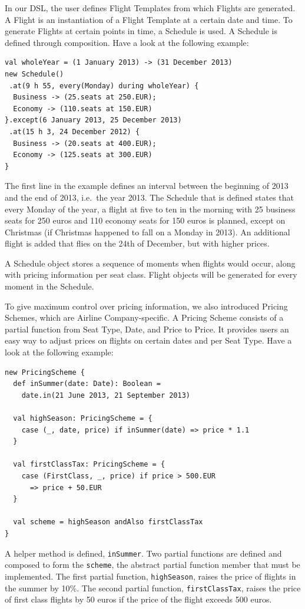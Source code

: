 \documentclass[a4paper]{article}
\renewcommand{\sc}[1]{\lstinline{#1}}
\begin{document}
In our DSL, the user defines Flight Templates from which Flights are generated.
A Flight is an instantiation of a Flight Template at a certain date and time.
To generate Flights at certain points in time, a Schedule is used.
A Schedule is defined through composition.
Have a look at the following example:
\begin{lstlisting}
val wholeYear = (1 January 2013) -> (31 December 2013)
new Schedule()
 .at(9 h 55, every(Monday) during wholeYear) {
  Business -> (25.seats at 250.EUR);
  Economy -> (110.seats at 150.EUR)
}.except(6 January 2013, 25 December 2013)
 .at(15 h 3, 24 December 2012) {
  Business -> (20.seats at 400.EUR);
  Economy -> (125.seats at 300.EUR)
}
\end{lstlisting}

The first line in the example defines an interval between the beginning of 2013 and the end of 2013, i.e.\ the year 2013.
The Schedule that is defined states that every Monday of the year, a flight at five to ten in the morning with 25 business seats for 250 euros and 110 economy seats for 150 euros is planned, except on Christmas (if Christmas happened to fall on a Monday in 2013).
An additional flight is added that flies on the 24th of December, but with higher prices.

A Schedule object stores a sequence of moments when flights would occur, along with pricing information per seat class.
Flight objects will be generated for every moment in the Schedule.

To give maximum control over pricing information, we also introduced Pricing Schemes, which are Airline Company-specific.
A Pricing Scheme consists of a partial function from Seat Type, Date, and Price to Price.
It provides users an easy way to adjust prices on flights on certain dates and per Seat Type.
Have a look at the following example:

\begin{lstlisting}
new PricingScheme {
  def inSummer(date: Date): Boolean =
    date.in(21 June 2013, 21 September 2013)

  val highSeason: PricingScheme = {
    case (_, date, price) if inSummer(date) => price * 1.1
  }

  val firstClassTax: PricingScheme = {
    case (FirstClass, _, price) if price > 500.EUR
      => price + 50.EUR
  }

  val scheme = highSeason andAlso firstClassTax
}
\end{lstlisting}

A helper method is defined, \sc{inSummer}.
Two partial functions are defined and composed to form the \sc{scheme}, the abstract partial function member that must be implemented.
The first partial function, \sc{highSeason}, raises the price of flights in the summer by 10\%.
The second partial function, \sc{firstClassTax}, raises the price of first class flights by 50 euros if the price of the flight exceeds 500 euros.
\end{document}
